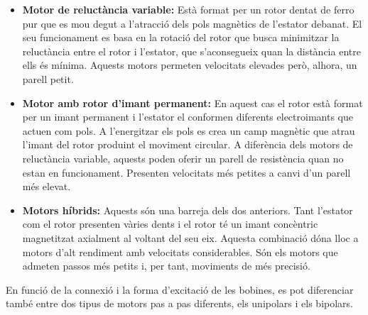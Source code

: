 \begin{itemize}
	\item \textbf{Motor de reluctància variable:} Està format per un rotor dentat de ferro pur que es mou degut a l'atracció dels pols magnètics de l'estator debanat. El seu funcionament es basa en la rotació del rotor que busca minimitzar la reluctància entre el rotor i l'estator, que s'aconsegueix quan la distància entre ells és mínima. Aquests motors permeten velocitats elevades però, alhora, un parell petit. 
	
	\item \textbf{Motor amb rotor d'imant permanent:} En aquest cas el rotor està format per un imant permanent i l'estator el conformen diferents electroimants que actuen com pols. A l'energitzar els pols es crea un camp magnètic que atrau l'imant del rotor produint el moviment circular. A diferència dels motors de reluctància variable, aquests poden oferir un parell de resistència quan no estan en funcionament. Presenten velocitats més petites a canvi d'un parell més elevat. 
	
	\item \textbf{Motors híbrids:} Aquests són una barreja dels dos anteriors. Tant l'estator com el rotor presenten vàries dents i el rotor té un imant concèntric magnetitzat axialment al voltant del seu eix. Aquesta combinació dóna lloc a motors d'alt rendiment amb velocitats considerables. Són els motors que admeten passos més petits i, per tant, moviments de més precisió. 
\end{itemize}
En funció de la connexió i la forma d'excitació de les  bobines, es pot diferenciar també entre dos tipus de motors pas a pas diferents, els unipolars i els bipolars.


